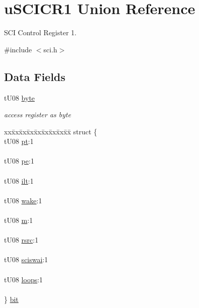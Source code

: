 \hypertarget{unionu_s_c_i_c_r1}{}\section{u\+S\+C\+I\+C\+R1 Union Reference}
\label{unionu_s_c_i_c_r1}


S\+C\+I Control Register 1.  




{\ttfamily \#include $<$sci.\+h$>$}

\subsection*{Data Fields}
\begin{DoxyCompactItemize}
\item 
\hypertarget{unionu_s_c_i_c_r1_aba308d63db050aed25cfd36c37e41ad4}{}t\+U08 \hyperlink{unionu_s_c_i_c_r1_aba308d63db050aed25cfd36c37e41ad4}{byte}\label{unionu_s_c_i_c_r1_aba308d63db050aed25cfd36c37e41ad4}

\begin{DoxyCompactList}\small\item\em access register as byte \end{DoxyCompactList}\item 
\hypertarget{unionu_s_c_i_c_r1_aa17c0e5a228b356020a048f40dfb8606}{}\begin{tabbing}
xx\=xx\=xx\=xx\=xx\=xx\=xx\=xx\=xx\=\kill
struct \{\\
\>tU08 \hyperlink{unionu_s_c_i_c_r1_a2ca1cc629f14218f4fed92bee480d313}{pt}:1\\
\>\\
\>tU08 \hyperlink{unionu_s_c_i_c_r1_a9015978b5dd53b0cf5a110bfff561d2e}{pe}:1\\
\>\\
\>tU08 \hyperlink{unionu_s_c_i_c_r1_a60ac7b28e962c7d6ca0017bee3bda0eb}{ilt}:1\\
\>\\
\>tU08 \hyperlink{unionu_s_c_i_c_r1_ad48dc259a0efd292e5a73dc148be1777}{wake}:1\\
\>\\
\>tU08 \hyperlink{unionu_s_c_i_c_r1_a771a35c306302b34d470aa1cfd193951}{m}:1\\
\>\\
\>tU08 \hyperlink{unionu_s_c_i_c_r1_a038b6003177d330e90e59b2a8806dda6}{rsrc}:1\\
\>\\
\>tU08 \hyperlink{unionu_s_c_i_c_r1_a8132a916bc71cb77a867f8bb201b24f3}{sciswai}:1\\
\>\\
\>tU08 \hyperlink{unionu_s_c_i_c_r1_a0fe9b333f2a73959d9272f3fa0764239}{loops}:1\\
\>\\
\} \hyperlink{unionu_s_c_i_c_r1_aa17c0e5a228b356020a048f40dfb8606}{bit}\label{unionu_s_c_i_c_r1_aa17c0e5a228b356020a048f40dfb8606}
\\


\end{tabbing}
\end{DoxyCompactItemize}
